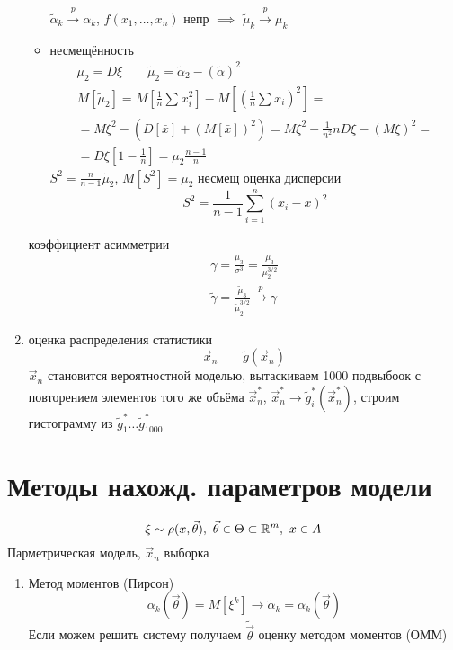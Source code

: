 \documentclass{article}
\begin{document}
\begin{enumerate}
\begin{itemize}
        $\tilde{\alpha}_k \overset{p}{\to} \alpha_k$, $f(x_1,\dots ,x_n)$ непр $\implies$
        $\tilde{\mu}_k \overset{p}{\to} \mu_k$ 
      \item несмещённость 
        \begin{gather*}
          \mu_2=D\xi \qquad \tilde{\mu}_2=\tilde{\alpha}_2 - (\tilde{\alpha})^{2} \\ 
          M[\tilde{\mu}_2]
          =M\left[\frac{1}{n}\sum_{}^{}x_i^{2}\right]-M\left[(\frac{1}{n}\sum_{}^{}x_i)^{2}\right] = \\
          = M\xi^{2}-(D[\bar{x}]+(M[\bar{x}])^{2})
          = M\xi^{2}-\frac{1}{n^{2}}nD\xi - (M\xi)^{2}= \\
          = D\xi \left[1-\frac{1}{n}\right]=\mu_2\frac{n-1}{n}
        \end{gather*}
        $S^{2}=\frac{n}{n-1}\tilde{\mu}_2$, $M[S^{2}]=\mu_2$ несмещ оценка дисперсии
        \[
          S^{2}=\frac{1}{n-1}\sum_{i=1}^{n}(x_i-\bar{x})^{2}
        \]
    \end{itemize}
    \hr
    коэффициент асимметрии
    \begin{gather*}
      \gamma=\frac{\mu_3}{\sigma^{3}}=\frac{\mu_3}{\mu_2^{3/2}} \\ 
      \tilde{\gamma}=\frac{\tilde{\mu}_3}{\tilde{\mu}_2^{3/2}} \overset{p}{\to}\gamma
    \end{gather*}
  \item оценка распределения статистики
    \[
      \vec{x}_n \qquad \tilde{g}(\vec{x}_n)
    \]
    $\vec{x}_n$ становится вероятностной моделью,
    вытаскиваем 1000 подвыбоок с повторением элементов того же объёма $\vec{x}_n^{*}$,
    $\vec{x}_n^{*} \rightarrow \tilde{g}_i^{*}(\vec{x}_n^{*})$,
    строим гистограмму из $\tilde{g}_1^{*}\dots \tilde{g}_{10 0 0}^{*}$
\end{enumerate}

\section{Методы нахожд. параметров модели}
\[
  \xi\sim \rho(x,\vec{\theta}), \ \vec{\theta}\in\Theta \subset \R^{m}, \ x\in A
\]
Парметрическая модель, $\vec{x}_n$ выборка
\begin{enumerate}
  \item Метод моментов (Пирсон)
    \[
      \alpha_k(\vec{\theta})=M[\xi^{k}] \rightarrow \tilde{\alpha}_k=\alpha_k(\vec{\theta})
    \]
    Если можем решить систему получаем $\tilde{\vec{\theta}}$ оценку методом моментов (ОММ)
\end{enumerate}
\end{document}
